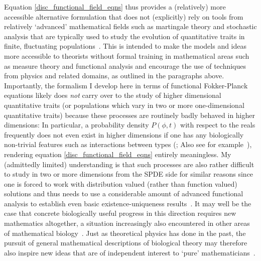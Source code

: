 Equation \eqref{disc_functional_field_eqns} thus provides a (relatively) more accessible alternative formulation that does not (explicitly) rely on tools from relatively `advanced' mathematical fields such as martingale theory and stochastic analysis that are typically used to study the evolution of quantitative traits in finite, fluctuating populations~\citep{dawson_stochastic_1975,fleming_measure-valued_1979,ethier_markov_1986,champagnat_unifying_2006,etheridge_mathematical_2011,week_white_2021}. This is intended to make the models and ideas more accessible to theorists without formal training in mathematical areas such as measure theory and functional analysis and encourage the use of techniques from physics and related domains, as outlined in the paragraphs above. Importantly, the formalism I develop here in terms of functional Fokker-Planck equations likely does \emph{not} carry over to the study of higher dimensional quantitative traits (or populations which vary in two or more one-dimensional quantitative traits) because these processes are routinely badly behaved in higher dimensions: In particular, a probability density $P(\phi,t)$ with respect to the reals frequently does not even exist in higher dimensions if one has any biologically non-trivial features such as interactions between types (\cite{fleming_measure-valued_1979, walsh_introduction_1986}; Also see for example~\cite{evans_measure-valued_1994}), rendering equation \eqref{disc_functional_field_eqns} entirely meaningless. My (admittedly limited) understanding is that such processes are also rather difficult to study in two or more dimensions from the SPDE side for similar reasons since one is forced to work with distribution valued (rather than function valued) solutions and thus needs to use a considerable amount of advanced functional analysis to establish even basic existence-uniqueness results~\citep{walsh_introduction_1986,carmona_stochastic_1999,prevot_concise_2007,liu_stochastic_2015,balan_gentle_2018}. It may well be the case that concrete biologically useful progress in this direction requires new mathematics altogether, a situation increasingly also encountered in other areas of mathematical biology~\citep{vittadello_open_2022}. Just as theoretical physics has done in the past, the pursuit of general mathematical descriptions of biological theory may therefore also inspire new ideas that are of independent interest to `pure' mathematicians~\citep{cohen_mathematics_2004}.

